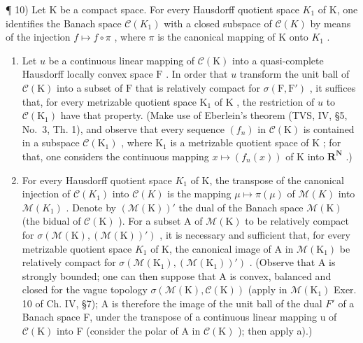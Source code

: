 ¶ 10) Let K be a compact space. For every Hausdorff quotient space \(K_{1}\) of K, one identifies the Banach space \(\mathcal{C}(K_{1})\) with a closed subspace of \(\mathcal{C}(K)\) by means of the injection \(f \mapsto f \circ \pi\) , where \(\pi\) is the canonical mapping of K onto \(K_{1}\) .

\begin{enumerate}
\def\labelenumi{\alph{enumi})}
\item
  Let \(u\) be a continuous linear mapping of \(\mathcal{C}(\mathrm{K})\) into a quasi-complete Hausdorff locally convex space \(\mathrm{F}\) . In order that \(u\) transform the unit ball of \(\mathcal{C}(\mathrm{K})\) into a subset of \(\mathrm{F}\) that is relatively compact for \(\sigma(\mathrm{F},\mathrm{F}')\) , it suffices that, for every metrizable quotient space \(\mathrm{K}_1\) of \(\mathrm{K}\) , the restriction of \(u\) to \(\mathcal{C}(\mathrm{K}_1)\) have that property. (Make use of Eberlein's theorem (TVS, IV, §5, No.~3, Th. 1), and observe that every sequence \((f_n)\) in \(\mathcal{C}(\mathrm{K})\) is contained in a subspace \(\mathcal{C}(\mathrm{K}_1)\) , where \(\mathrm{K}_1\) is a metrizable quotient space of \(\mathrm{K}\) ; for that, one considers the continuous mapping \(x \mapsto (f_n(x))\) of \(\mathrm{K}\) into \(\mathbf{R}^{\mathbf{N}}\) .)
\item
  For every Hausdorff quotient space \(K_{1}\) of K, the transpose of the canonical injection of \(\mathcal{C}(K_{1})\) into \(\mathcal{C}(K)\) is the mapping \(\mu\mapsto\pi(\mu)\) of \(\mathcal{M}(K)\) into \(\mathcal{M}(K_{1})\) . Denote by \((\mathcal{M}(\mathrm{K}))'\) the dual of the Banach space \(\mathcal{M}(\mathrm{K})\) (the bidual of \(\mathcal{C}(\mathrm{K})\) ). For a subset A of \(\mathcal{M}(\mathrm{K})\) to be relatively compact for \(\sigma(\mathcal{M}(\mathrm{K}),(\mathcal{M}(\mathrm{K}))')\) , it is necessary and sufficient that, for every metrizable quotient space \(K_{1}\) of K, the canonical image of A in \(\mathcal{M}(\mathrm{K}_{1})\) be relatively compact for \(\sigma(\mathcal{M}(\mathrm{K}_{1}),(\mathcal{M}(\mathrm{K}_{1}))')\) . (Observe that A is strongly bounded; one can then suppose that A is convex, balanced and closed for the vague topology \(\sigma(\mathcal{M}(\mathrm{K}),\mathcal{C}(\mathrm{K}))\) (apply in \(\mathcal{M}(\mathrm{K}_{1})\) Exer. 10 of Ch. IV, §7); A is therefore the image of the unit ball of the dual \(F'\) of a Banach space F, under the transpose of a continuous linear mapping u of \(\mathcal{C}(\mathrm{K})\) into F (consider the polar of A in \(\mathcal{C}(\mathrm{K})\) ); then apply a).)
\end{enumerate}

